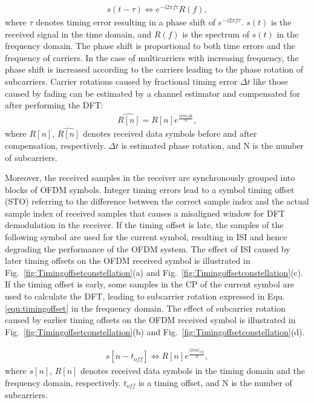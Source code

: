 \begin{eqnarray}
\label{equ:timingoffset}
               s (t - \tau )   \Leftrightarrow  e^{-i2\pi f\tau} R(f),
\end{eqnarray}
where $\tau$ denotes timing error resulting in a phase shift of $e^{-i2\pi f\tau}$.
$s(t)$ is the received signal in the time domain, and $R(f)$ is the spectrum of $s(t)$ in the frequency domain.
The phase shift is proportional to both time errors and the frequency of carriers.
In the case of multicarriers with increasing frequency, the phase shift is increased according to the carriers leading to the phase rotation of subcarriers.
Carrier rotations caused by fractional timing error $\Delta t$ like those caused by fading can be estimated by a channel estimator and compensated for after performing the DFT:
\begin{eqnarray}
\label{equ:rotationcompensation}
               \widehat{R[n]} = R[n] e^{\frac{i2\pi n \Delta  t}{N}},
\end{eqnarray}
where $R[n]$, $\widehat{R[n]}$ denotes received data symbols before and after compensation, respectively. $\Delta t$ is estimated phase rotation, and N is the number of subcarriers.

Moreover, the received samples in the receiver are synchronously grouped into blocks of OFDM symbols.
Integer timing errors lead to a symbol timing offset (STO) referring to the difference between the correct sample index and the actual sample index of received samples that causes a misaligned window for DFT demodulation in the receiver.
If the timing offset is late, the samples of the following symbol are used for the current symbol, resulting in ISI and hence degrading the performance of the OFDM system. The effect of ISI caused by later timing offsets on the OFDM received symbol is illustrated in Fig.~\ref{fig:Timingoffsetconstellation}(a) and Fig.~\ref{fig:Timingoffsetconstellation}(c).
If the timing offset is early, some samples in the CP of the current symbol are used to calculate the DFT, leading to subcarrier rotation expressed in Equ.\ref{equ:timingoffset} in the frequency domain.
The effect of subcarrier rotation caused by earlier timing offsets on the OFDM received symbol is illustrated in Fig.~\ref{fig:Timingoffsetconstellation}(b) and Fig.~\ref{fig:Timingoffsetconstellation}(d).

\begin{eqnarray}
\label{equ:rotationcompensation}
              s[n - t_{\mathit{off}}]  \Leftrightarrow R[n] e^{\frac{i2\pi n t_{\mathit{off}}}{N}},
\end{eqnarray}
where $s[n]$, $R[n]$ denotes received data symbols in the timing domain and the frequency domain, respectively. $t_{\mathit{off}}$ is a timing offset, and N is the number of subcarriers.


